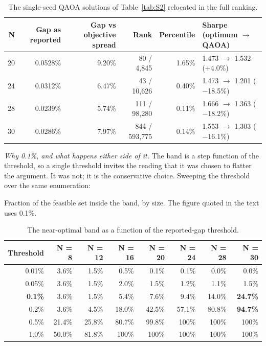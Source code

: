 \documentclass[journal]{IEEEtran}
\begin{document}
\begin{table}[!t]
\centering
\scriptsize
\caption{The single-seed QAOA solutions of Table~\ref{tab:S2} relocated in the full ranking.}
\label{tab:S4}
\begin{tabular}{rrrrrl}
\toprule
N & Gap as reported & Gap vs objective spread & Rank & Percentile & Sharpe (optimum $\rightarrow$ QAOA) \\
\midrule
20 & 0.0528\% & 9.20\% & 80 / 4,845 & 1.65\% & 1.473 $\rightarrow$ 1.532 (+4.0\%) \\
24 & 0.0312\% & 6.47\% & 43 / 10,626 & 0.40\% & 1.473 $\rightarrow$ 1.201 ($-$18.5\%) \\
28 & 0.0239\% & 5.74\% & 111 / 98,280 & 0.11\% & 1.666 $\rightarrow$ 1.363 ($-$18.2\%) \\
30 & 0.0286\% & 7.97\% & 844 / 593,775 & 0.14\% & 1.553 $\rightarrow$ 1.303 ($-$16.1\%) \\
\bottomrule
\end{tabular}
\end{table}


\textit{Why 0.1\%, and what happens either side of it.} The band is a step function of the threshold, so a single threshold invites the reading that it was chosen to flatter the argument. It was not; it is the conservative choice. Sweeping the threshold over the same enumeration:


Fraction of the feasible set inside the band, by size. The figure quoted in the text uses 0.1\%.


\begin{table}[!t]
\centering
\scriptsize
\caption{The near-optimal band as a function of the reported-gap threshold.}
\label{tab:S5}
\begin{tabular}{rrrrrrrr}
\toprule
Threshold & N = 8 & N = 12 & N = 16 & N = 20 & N = 24 & N = 28 & N = 30 \\
\midrule
0.01\% & 3.6\% & 1.5\% & 0.5\% & 0.1\% & 0.1\% & 0.0\% & 0.0\% \\
0.05\% & 3.6\% & 1.5\% & 2.0\% & 1.5\% & 1.2\% & 1.1\% & 1.5\% \\
\textbf{0.1\%} & 3.6\% & 1.5\% & 5.4\% & 7.6\% & 9.4\% & 14.0\% & \textbf{24.7\%} \\
0.2\% & 3.6\% & 4.5\% & 18.0\% & 42.5\% & 57.1\% & 80.8\% & \textbf{94.7\%} \\
0.5\% & 21.4\% & 25.8\% & 80.7\% & 99.8\% & 100\% & 100\% & 100\% \\
1.0\% & 50.0\% & 81.8\% & 100\% & 100\% & 100\% & 100\% & 100\% \\
\bottomrule
\end{tabular}
\end{table}
\end{document}
